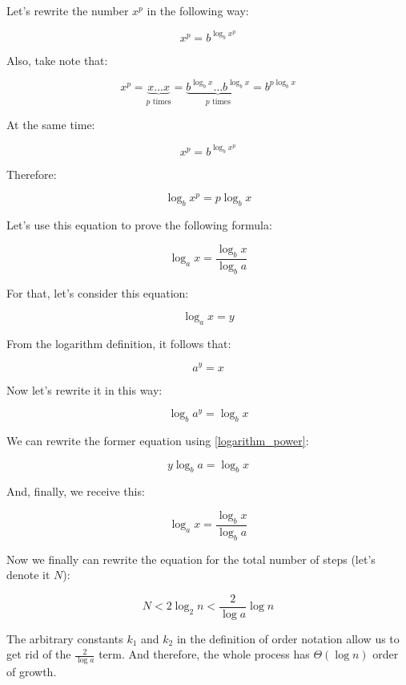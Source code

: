 Let's rewrite the number $x^p$ in the following way:

\[
x^p = b^{\log_b x^p}
\]

Also, take note that:

\[
x^p = \underbrace{x \dots x}_\text{$p$ times} = \underbrace{b^{\log_b x} \dots b^{\log_b x}}_\text{$p$ times} = 
b^{p \log_b x}
\]

At the same time:

\[
x^p = b^{\log_b x^p}
\]

Therefore:

\begin{equation}
\log_b x^p = p \log_b x \label{logarithm_power}
\end{equation}

Let's use this equation to prove the following formula:

\[
\log_a x = \frac{\log_b x}{\log_b a}
\]

For that, let's consider this equation:

\[
\log_a x = y
\]

From the logarithm definition, it follows that:

\[
a^y = x
\]

Now let's rewrite it in this way:

\[
\log_b a^y = \log_b x
\]

We can rewrite the former equation using \eqref{logarithm_power}:

\[
y \log_b a = \log_b x
\]

And, finally, we receive this:

\[
\log_a x = \frac{\log_b x}{\log_b a}
\]

Now we finally can rewrite the equation for the total number of steps (let's denote it $N$):

\[
N < 2 \log_2 n < \frac{2}{\log a} \log n
\]

The arbitrary constants $k_1$ and $k_2$ in the definition of order notation allow us to get rid of the $\frac{2}{\log a}$ term. And therefore, the whole process has $\Theta(\log n)$ order of growth.

